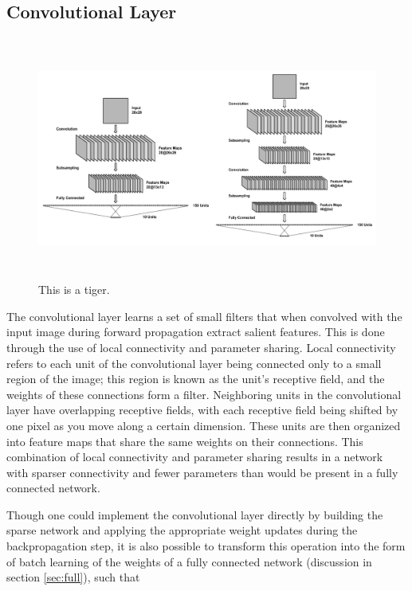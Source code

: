 \documentclass[10pt,twocolumn,letterpaper]{article}
\begin{document}
\subsection{Convolutional Layer}

\begin{figure}
  \includegraphics[width=\textwidth,height=8cm]{botharcs}
  \caption{This is a tiger.}
  \label{fig:convarcs}
\end{figure}

The convolutional layer learns a set of small filters that when convolved with the input image
during forward propagation extract salient features. This is done through the use of local
connectivity and parameter sharing. Local connectivity refers to each unit of the convolutional
layer being connected only to a small region of the image; this region is known as the unit’s
receptive field, and the weights of these connections form a filter. Neighboring units in the
convolutional layer have overlapping receptive fields, with each receptive field being shifted
by one pixel as you move along a certain dimension. These units are then organized into feature
maps that share the same weights on their connections. This combination of local connectivity
and parameter sharing results in a network with sparser connectivity and fewer parameters than
would be present in a fully connected network.

Though one could implement the convolutional layer directly by building the sparse network and
applying the appropriate weight updates during the backpropagation step, it is also possible to
transform this operation into the form of batch learning of the weights of a fully connected
network (discussion in section \ref{sec:full}), such that
\end{document}
